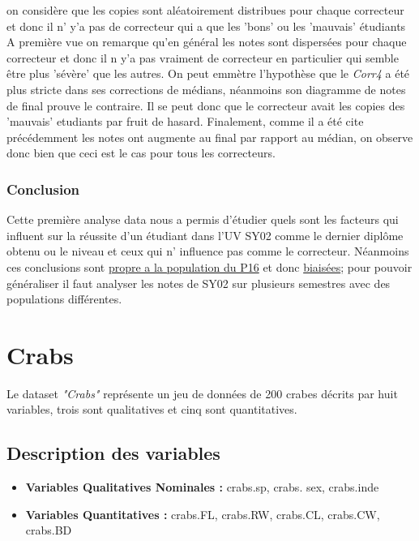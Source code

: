 \documentclass[10pt]{article}
\begin{document}
on considère que les copies sont aléatoirement distribues pour chaque correcteur et donc il n' y'a pas de correcteur qui a que les 'bons' ou les 'mauvais' étudiants A première vue on remarque qu'en général les notes sont dispersées pour chaque correcteur et donc il n y'a pas vraiment de correcteur en particulier qui semble être plus 'sévère' que les autres. On peut emmètre l'hypothèse  que le \textit{Corr4} a été plus stricte dans ses corrections de médians, néanmoins son diagramme de notes de final prouve le contraire. Il se peut donc que le correcteur avait les copies des 'mauvais' etudiants par fruit de hasard. Finalement, comme il a été cite précédemment les notes ont augmente au final par rapport au médian, on observe donc bien que ceci est le cas pour tous les correcteurs.

\subsubsection{Conclusion}
Cette première analyse data nous a permis d'étudier  quels sont les facteurs qui influent sur la réussite d'un étudiant dans l'UV SY02 comme le dernier diplôme obtenu ou le niveau et ceux qui n' influence pas comme le correcteur. Néanmoins ces conclusions sont \underline{propre a la population du P16} et donc  \underline{biaisées}; pour pouvoir généraliser il faut analyser les notes de SY02 sur plusieurs semestres avec des populations différentes.

\section{Crabs}
Le dataset \textit{"Crabs"} représente un jeu de données de 200 crabes décrits par huit variables, trois sont qualitatives et cinq sont quantitatives.

\subsection{Description des variables}


\begin{itemize}
	\item \textbf{Variables Qualitatives Nominales :}  crabs.sp, crabs. sex, crabs.inde
	\item \textbf{Variables Quantitatives : } crabs.FL, crabs.RW, crabs.CL, crabs.CW, crabs.BD
\end{itemize}
\end{document}
